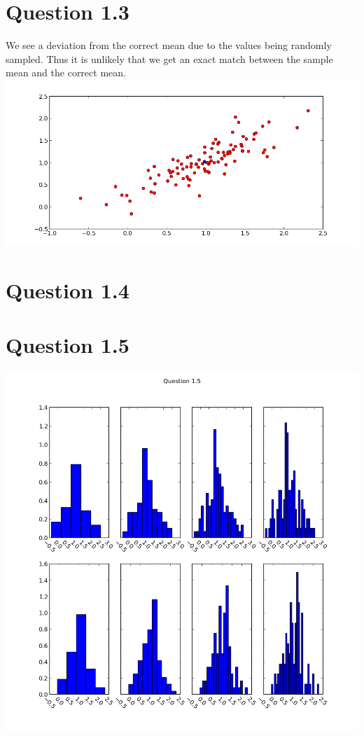 \documentclass[11pt,a4paper]{article}
\begin{document}
\section{Question 1.3}
We see a deviation from the correct mean due to the values being randomly sampled. Thus it
is unlikely that we get an exact match between the sample mean and the correct mean.
\includegraphics[scale=0.6]{figure_2.png}
\section{Question 1.4}
\section{Question 1.5}
\includegraphics[scale=0.6]{figure_3.png}
\end{document}
